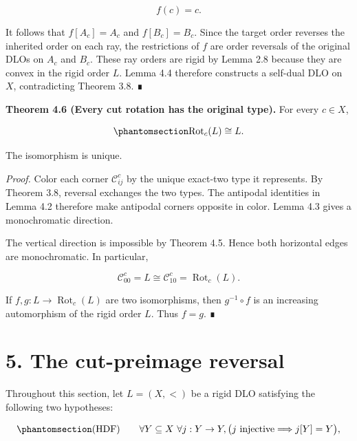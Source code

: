\documentclass[
  english,
  11pt,
  reqno]{amsart}
\begin{document}
\[
f(c)=c.
\]

It follows that \(f[A_c]=A_c\) and \(f[B_c]=B_c\). Since the target
order reverses the inherited order on each ray, the restrictions of
\(f\) are order reversals of the original DLOs on \(A_c\) and \(B_c\).
These ray orders are rigid by Lemma 2.8 because they are convex in the
rigid order \(L\). Lemma 4.4 therefore constructs a self-dual DLO on
\(X\), contradicting Theorem 3.8. ∎

\protect{}\label{thm:4-6-cut-rotation-type}

\textbf{Theorem 4.6 (Every cut rotation has the original type).} For
every \(c\in X\),

\begin{equation}\protect\phantomsection\label{eq:all-cut-rotations}{
\operatorname{Rot}_c(L)
\cong
L.
}\end{equation}

The isomorphism is unique.

\emph{Proof.} Color each corner \(\mathcal C_{ij}^c\) by the unique
exact-two type it represents. By Theorem 3.8, reversal exchanges the two
types. The antipodal identities in Lemma 4.2 therefore make antipodal
corners opposite in color. Lemma 4.3 gives a monochromatic direction.

The vertical direction is impossible by Theorem 4.5. Hence both
horizontal edges are monochromatic. In particular,

\[
\mathcal C_{00}^c
=
L
\cong
\mathcal C_{10}^c
=
\operatorname{Rot}_c(L).
\]

If \(f,g:L\to\operatorname{Rot}_c(L)\) are two isomorphisms, then
\(g^{-1}\circ f\) is an increasing automorphism of the rigid order
\(L\). Thus \(f=g\). ∎

\protect{}\label{sec:cut-preimage}

\section{5. The cut-preimage reversal}\label{the-cut-preimage-reversal}

Throughout this section, let \(L=(X,<)\) be a rigid DLO satisfying the
following two hypotheses:

\begin{equation}\protect\phantomsection\label{eq:hereditary-dedekind-finiteness}{
(\mathrm{HDF})
\qquad
\forall Y\subseteq X\ \forall j:Y\to Y,
\bigl(j\text{ injective}\Longrightarrow j[Y]=Y\bigr),
}\end{equation}
\end{document}
